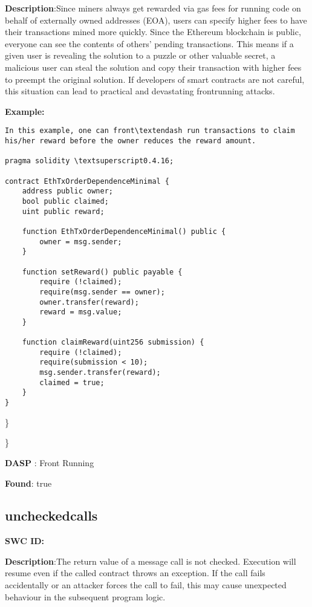 \documentclass{article}
\begin{document}
\textbf{Description}:Since miners always get rewarded via gas fees for running code on behalf of externally owned addresses (EOA), users can specify higher fees to have their transactions mined more quickly. Since the Ethereum blockchain is public, everyone can see the contents of others' pending transactions. This means if a given user is revealing the solution to a puzzle or other valuable secret, a malicious user can steal the solution and copy their transaction with higher fees to preempt the original solution. If developers of smart contracts are not careful, this situation can lead to practical and devastating front\textendash running attacks.


\textbf{Example:} 
\begin{verbatim}
In this example, one can front\textendash run transactions to claim his/her reward before the owner reduces the reward amount.

pragma solidity \textsuperscript0.4.16;

contract EthTxOrderDependenceMinimal {
    address public owner;
    bool public claimed;
    uint public reward;

    function EthTxOrderDependenceMinimal() public {
        owner = msg.sender;
    }

    function setReward() public payable {
        require (!claimed);
        require(msg.sender == owner);
        owner.transfer(reward);
        reward = msg.value;
    }

    function claimReward(uint256 submission) {
        require (!claimed);
        require(submission < 10);
        msg.sender.transfer(reward);
        claimed = true;
    }
}

\end{verbatim}\} 

\} 

\textbf{DASP} : Front Running

\textbf{Found}: true

\subsection{unchecked\textunderscore calls} 
\textbf{SWC \textunderscore ID:} 

\textbf{Description}:The return value of a message call is not checked. Execution will resume even if the called contract throws an exception. If the call fails accidentally or an attacker forces the call to fail, this may cause unexpected behaviour in the subsequent program logic.
\end{document}
